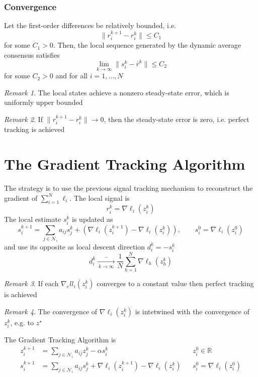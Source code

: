 \documentclass{book}
\newcommand{\R}{\mathbb{R}}
\theoremstyle{theoremv2}
\theoremstyle{defv2}
\theoremstyle{remark}
\newtheorem*{remark}{Remark}
\theoremstyle{remark}
\theoremstyle{definition}
\theoremstyle{definition}
\begin{document}
\subsubsection{Convergence}
Let the first-order differences be relatively bounded, i.e. 
\[
    \|r_i^{k+1}-r_i^k\| \leq C_1
\]
for some $C_1>0$. Then, the local sequence generated by the dynamic average consensus satisfies 
\[
    \lim_{k\to\infty} \|s_i^k - \bar{r}^k\|\leq C_2
\]
for some $C_2>0$ and for all $i=1,\dots,N$
\begin{remark}
    The local states achieve a nonzero steady-state error, which is uniformly upper bounded
\end{remark}
\begin{remark}
    If $\|r_i^{k+1}-r_i^k\|\to0$, then the steady-state error is zero, i.e. perfect tracking is achieved
\end{remark}

\section{The Gradient Tracking Algorithm}
The strategy is to use the previous signal tracking mechanism to reconstruct the gradient of $\displaystyle\sum_{i=1}^{N}\ell_i$. The local signal is 
\[
    r_i^k = \nabla \ell_i(z_i^k)
\]
The local estimate $s_i^k$ is updated as
\[
    s_i^{k+1} = \displaystyle\sum_{j\in\mathcal{N}_i} a_{ij}s_j^k + \left(\nabla\ell_i(z_i^{k+1})-\nabla\ell_i(z_i^k)\right), \qquad s_i^0 = \nabla\ell_i(z_i^0)
\]
and use its opposite as local descent direction $d_i^k = -s_i^k$
\[
    d_i^k \xrightarrow[\ k\to\infty\ ]-\displaystyle\frac{1}{N} \displaystyle\sum_{h=1}^{N}\nabla\ell_h(z_h^k)
\]
\begin{remark}
    If each $\nabla_ell_i(z_i^k)$ converges to a constant value then perfect tracking is achieved
\end{remark}
\begin{remark}
    The convergence of $\nabla\ell_i(z_i^k)$ is intetwined with the convergence of $z_i^k$, e.g. to $z^\star$
\end{remark}
The Gradient Tracking Algorithm is 
\begin{align*}
    z_i^{k+1} &= \displaystyle\sum_{j\in\mathcal{N}_i} a_{ij}z_j^k - \alpha s_i^k && z_i^0\in\R\\
    s_i^{k+1} &= \displaystyle\sum_{j\in\mathcal{N}_i} a_{ij}s_j^k + \nabla\ell_i(z_i^{k+1}) - \nabla\ell_i(z_i^k) &&s_i^0=\nabla\ell_i(z_i^0)
\end{align*}
\end{document}
